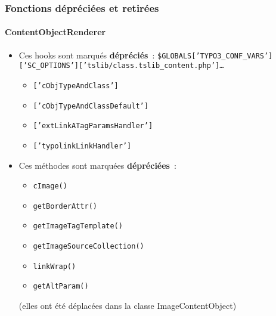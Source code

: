 \begin{frame}[fragile]
	\frametitle{Fonctions dépréciées et retirées}
	\framesubtitle{ContentObjectRenderer}

	\begin{itemize}
		\item Ces hooks sont marqués \textbf{dépréciés}~:\newline
			\tiny
				\texttt{\$GLOBALS['TYPO3\_CONF\_VARS']['SC\_OPTIONS']['tslib/class.tslib\_content.php']\ldots}
			\normalsize

			\begin{itemize}\smaller
				\item \texttt{['cObjTypeAndClass']}
				\item \texttt{['cObjTypeAndClassDefault']}
				\item \texttt{['extLinkATagParamsHandler']}
				\item \texttt{['typolinkLinkHandler']}
			\end{itemize}

		\item Ces méthodes sont marquées \textbf{dépréciées}~:

			\begin{itemize}\smaller
				\item \texttt{cImage()}
				\item \texttt{getBorderAttr()}
				\item \texttt{getImageTagTemplate()}
				\item \texttt{getImageSourceCollection()}
				\item \texttt{linkWrap()}
				\item \texttt{getAltParam()}
			\end{itemize}

			\smaller
				(elles ont été déplacées dans la classe ImageContentObject)
			\normalsize

	\end{itemize}

\end{frame}


